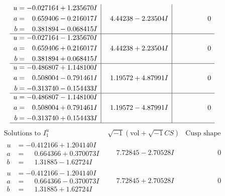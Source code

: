 \documentclass[1p]{elsarticle_modified}
\theoremstyle{definition}
\newcommand{\I}{\sqrt{-1}}
\begin{document}
$$\begin{array}{c|c|c}
\begin{aligned}
u &= -0.027164 + 1.235670 I \\
a &= \phantom{-}0.659406 - 0.216017 I \\
b &= \phantom{-}0.381894 - 0.068415 I\end{aligned}
 & \phantom{-}4.44238 - 2.23504 I & \phantom{-0.000000 } 0 \\ \hline\begin{aligned}
u &= -0.027164 - 1.235670 I \\
a &= \phantom{-}0.659406 + 0.216017 I \\
b &= \phantom{-}0.381894 + 0.068415 I\end{aligned}
 & \phantom{-}4.44238 + 2.23504 I & \phantom{-0.000000 } 0 \\ \hline\begin{aligned}
u &= -0.486807 + 1.148100 I \\
a &= \phantom{-}0.508004 - 0.791461 I \\
b &= -0.313740 - 0.154433 I\end{aligned}
 & \phantom{-}1.19572 + 4.87991 I & \phantom{-0.000000 } 0 \\ \hline\begin{aligned}
u &= -0.486807 - 1.148100 I \\
a &= \phantom{-}0.508004 + 0.791461 I \\
b &= -0.313740 + 0.154433 I\end{aligned}
 & \phantom{-}1.19572 - 4.87991 I & \phantom{-0.000000 } 0\\
 \hline 
 \end{array}$$\newpage$$\begin{array}{c|c|c}  
\text{Solutions to }I^u_{1}& \I (\text{vol} + \sqrt{-1}CS) & \text{Cusp shape}\\
 \hline 
\begin{aligned}
u &= -0.412166 + 1.204140 I \\
a &= \phantom{-}0.664366 + 0.370073 I \\
b &= \phantom{-}1.31885 - 1.62724 I\end{aligned}
 & \phantom{-}7.72845 - 2.70528 I & \phantom{-0.000000 } 0 \\ \hline\begin{aligned}
u &= -0.412166 - 1.204140 I \\
a &= \phantom{-}0.664366 - 0.370073 I \\
b &= \phantom{-}1.31885 + 1.62724 I\end{aligned}
 & \phantom{-}7.72845 + 2.70528 I & \phantom{-0.000000 } 0 \\ \hline\begin{aligned}

\end{aligned}
\end{array}$$
\end{document}
